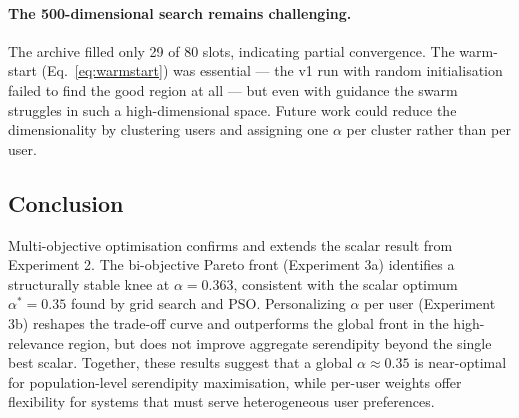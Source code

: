 \paragraph{The 500-dimensional search remains challenging.}
The archive filled only 29 of 80 slots, indicating partial convergence.
The warm-start (Eq.~\ref{eq:warmstart}) was essential --- the v1 run with
random initialisation failed to find the good region at all --- but even with
guidance the swarm struggles in such a high-dimensional space.  Future work
could reduce the dimensionality by clustering users and assigning one $\alpha$
per cluster rather than per user.

\subsection{Conclusion}

Multi-objective optimisation confirms and extends the scalar result from
Experiment 2.  The bi-objective Pareto front (Experiment 3a) identifies a
structurally stable knee at $\alpha = 0.363$, consistent with the scalar
optimum $\alpha^* = 0.35$ found by grid search and PSO.  Personalizing
$\alpha$ per user (Experiment 3b) reshapes the trade-off curve and outperforms
the global front in the high-relevance region, but does not improve aggregate
serendipity beyond the single best scalar.  Together, these results suggest
that a global $\alpha \approx 0.35$ is near-optimal for population-level
serendipity maximisation, while per-user weights offer flexibility for systems
that must serve heterogeneous user preferences.
